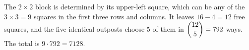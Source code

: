 The $2\times2$ block is determined by its upper-left square, which can be any of the $3\times3=9$ squares in the first three rows and columns. It leaves $16-4=12$ free squares, and the five identical outposts choose $5$ of them in $\dbinom{12}{5}=792$ ways. The total is $9\cdot792=\boxed{7128}$.
